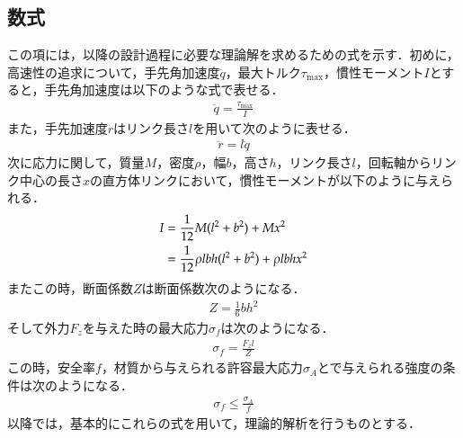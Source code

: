 \documentclass[10pt,b5paper,papersize,dvipdfmx]{jsbook}
\begin{document}
\subsection{数式}\label{数式}
この項には，以降の設計過程に必要な理論解を求めるための式を示す．初めに，高速性の追求について，手先角加速度$\ddot{q}$，最大トルク$\tau_{\mathrm{max}}$，慣性モーメント$I$とすると，手先角加速度は以下のような式で表せる．
\begin{align}
\ddot{q}=\frac{\tau_{\mathrm{max}}}{I}
\end{align}
また，手先加速度$\ddot{r}$はリンク長さ$l$を用いて次のように表せる．
\begin{align}
\ddot{r}=l\ddot{q}
\end{align}
次に応力に関して，質量$M$，密度$\rho$，幅$b$，高さ$h$，リンク長さ$l$，回転軸からリンク中心の長さ$x$の直方体リンクにおいて，慣性モーメントが以下のように与えられる．
\begin{align}
  I &= \frac{1}{12}M(l^2+b^2)+Mx^2 \notag\\
    &= \frac{1}{12} \rho lbh(l^2+b^2 )+\rho lbhx^2
\end{align}
またこの時，断面係数$Z$は断面係数次のようになる．
\begin{align}
  Z=\frac{1}{6}bh^2
\end{align}
そして外力$F_z$を与えた時の最大応力$\sigma_f$は次のようになる．
\begin{align}
  \sigma_f=\frac{F_zl}{Z}
\end{align}
この時，安全率$f$，材質から与えられる許容最大応力$\sigma_A$とで与えられる強度の条件は次のようになる．
\begin{align}
  \sigma_f\leq\frac{\sigma_A}{f}
\end{align}
以降では，基本的にこれらの式を用いて，理論的解析を行うものとする．

\clearpage %
\end{document}
